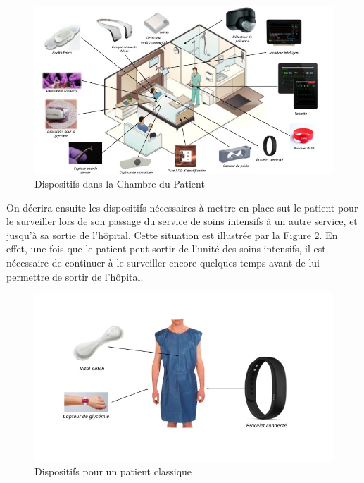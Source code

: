 \documentclass{article}
\begin{document}
\begin{figure}[h!]
	\hspace*{-3cm}
	\centering
	\includegraphics[width=1.5\textwidth]{Figure1.jpg}
	\caption{Dispositifs dans la Chambre du Patient}
	\label{fig:balance}
\end{figure}

On décrira ensuite les dispositifs nécessaires à mettre en place sut le patient pour le surveiller lors de son passage du service de soins intensifs à un autre service, et jusqu’à sa sortie de l’hôpital. Cette situation est illustrée par la Figure 2. En effet, une fois que le patient peut sortir de l'unité des soins intensifs, il est nécessaire de continuer à le surveiller encore quelques temps avant de lui permettre de sortir de l’hôpital.
\\
\begin{figure}[h!]
	\hspace*{-1cm}
	\centering
	\includegraphics[width=1.2\textwidth]{Figure2.jpg}
	\caption{Dispositifs pour un patient classique}
	\label{fig:balance}
\end{figure}
\end{document}
